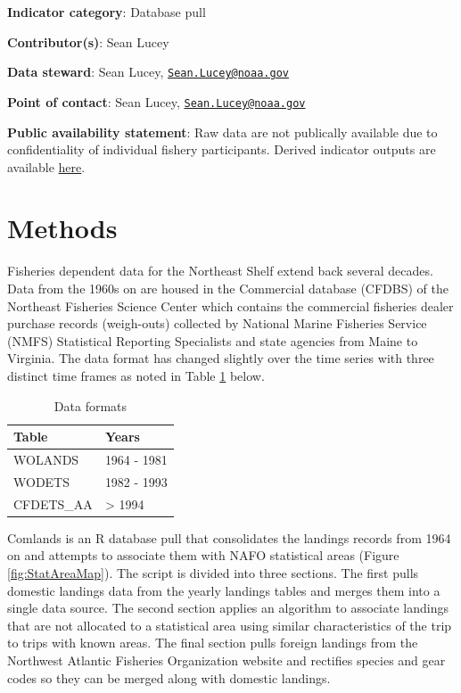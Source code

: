 \documentclass[
]{book}
\begin{document}
\textbf{Indicator category}: Database pull

\textbf{Contributor(s)}: Sean Lucey

\textbf{Data steward}: Sean Lucey, \href{mailto:Sean.Lucey@noaa.gov}{\nolinkurl{Sean.Lucey@noaa.gov}}

\textbf{Point of contact}: Sean Lucey, \href{mailto:Sean.Lucey@noaa.gov}{\nolinkurl{Sean.Lucey@noaa.gov}}

\textbf{Public availability statement}: Raw data are not publically available due to confidentiality of individual fishery participants. Derived indicator outputs are
available \href{https://comet.nefsc.noaa.gov/erddap/tabledap/group_landings_soe_v1.html}{here}.

\hypertarget{methods-20}{%
\section{Methods}\label{methods-20}}

Fisheries dependent data for the Northeast Shelf extend back several decades. Data from the 1960s on are housed in the Commercial database (CFDBS) of the Northeast Fisheries Science Center which contains the commercial fisheries dealer purchase records (weigh-outs) collected by National Marine Fisheries Service (NMFS) Statistical Reporting Specialists and state agencies from Maine to Virginia. The data format has changed slightly over the time series with three distinct time frames as noted in Table \ref{tab:calibration1} below.

\begin{table}

\caption{\label{tab:calibration1}Data formats}
\centering
\begin{tabular}[t]{ll}
\toprule
Table & Years\\
\midrule
WOLANDS & 1964 - 1981\\
WODETS & 1982 - 1993\\
CFDETS\_AA & > 1994\\
\bottomrule
\end{tabular}
\end{table}

Comlands is an R database pull that consolidates the landings records from 1964 on and attempts to associate them with NAFO statistical areas (Figure \ref{fig:StatAreaMap}). The script is divided into three sections. The first pulls domestic landings data from the yearly landings tables and merges them into a single data source. The second section applies an algorithm to associate landings that are not allocated to a statistical area using similar characteristics of the trip to trips with known areas. The final section pulls foreign landings from the Northwest Atlantic Fisheries Organization website and rectifies species and gear codes so they can be merged along with domestic landings.
\end{document}
